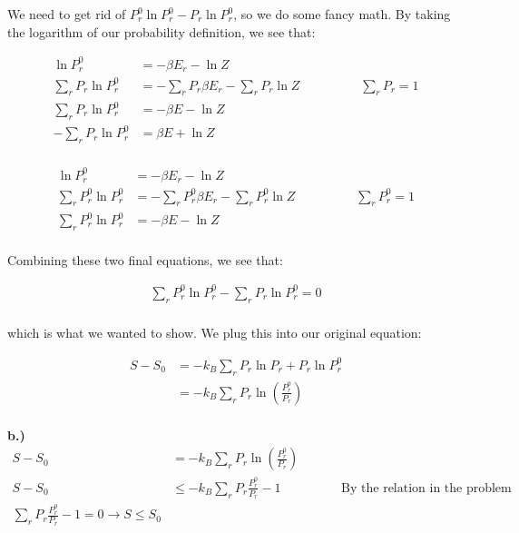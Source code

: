 \documentclass[10pt]{article} %
\begin{document}
We need to get rid of $P_r^0\ln P_r^0 - P_r\ln P_r^0$, so we do some fancy math. By taking
the logarithm of our probability definition, we see that:

\begin{align*}
  \ln P_r^0 &= -\beta E_r - \ln Z\\
  \sum_r P_r\ln P_r^0 &= -\sum_r P_r\beta E_r - \sum_r P_r\ln Z
  \hspace{2cm}\sum_r P_r=1\\
  \sum_r P_r\ln P_r^0 &= -\beta E - \ln Z\\
  -\sum_r P_r\ln P_r^0 &= \beta E + \ln Z\\
\end{align*}

\begin{align*}
  \ln P_r^0 &= -\beta E_r - \ln Z\\
  \sum_r P_r^0\ln P_r^0 &= -\sum_r P_r^0\beta E_r - \sum_r P_r^0\ln Z
  \hspace{2cm}\sum_r P_r^0=1\\
  \sum_r P_r^0\ln P_r^0 &= -\beta E - \ln Z\\
\end{align*}

Combining these two final equations, we see that:

\begin{align*}
  \sum_r P_r^0\ln P_r^0 - \sum_r P_r\ln P_r^0 = 0\\
\end{align*}

which is what we wanted to show. We plug this into our original equation:

\begin{align*}
  S - S_0 &= -k_B\sum_rP_r\ln P_r + P_r\ln P_r^0\\
  &= -k_B\sum_r P_r \ln\left(\frac{P_r^0}{P_r}\right)\\
\end{align*}

\textbf{b.)}
\begin{align*}
  S - S_0 &= -k_B\sum_r P_r \ln\left(\frac{P_r^0}{P_r}\right)\\
  S - S_0 &\leq -k_B\sum_r P_r \frac{P_r^0}{P_r} - 1
  \hspace{2cm}\mbox{By the relation in the problem}\\
  \sum_r P_r \frac{P_r^0}{P_r} -1 = 0 \rightarrow S \leq S_0\\
\end{align*}
\end{document}
